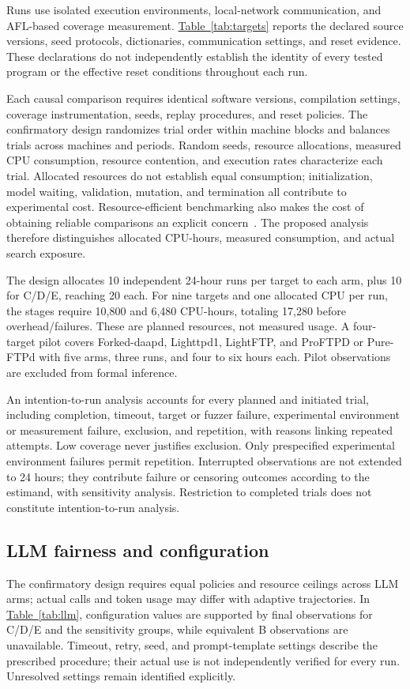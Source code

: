 \documentclass[final,5p,times,number]{elsarticle}
\newcommand{\namedref}[2]{\hyperref[#2]{#1~\ref*{#2}}}
\begin{document}
Runs use isolated execution environments, local-network communication, and AFL-based coverage measurement. \namedref{Table}{tab:targets} reports the declared source versions, seed protocols, dictionaries, communication settings, and reset evidence. These declarations do not independently establish the identity of every tested program or the effective reset conditions throughout each run.

Each causal comparison requires identical software versions, compilation settings, coverage instrumentation, seeds, replay procedures, and reset policies. The confirmatory design randomizes trial order within machine blocks and balances trials across machines and periods. Random seeds, resource allocations, measured CPU consumption, resource contention, and execution rates characterize each trial. Allocated resources do not establish equal consumption; initialization, model waiting, validation, mutation, and termination all contribute to experimental cost. Resource-efficient benchmarking also makes the cost of obtaining reliable comparisons an explicit concern~\cite{greenbenchmark2023}. The proposed analysis therefore distinguishes allocated CPU-hours, measured consumption, and actual search exposure.

The design allocates 10 independent 24-hour runs per target to each arm, plus 10 for C/D/E, reaching 20 each. For nine targets and one allocated CPU per run, the stages require 10,800 and 6,480 CPU-hours, totaling 17,280 before overhead/failures. These are planned resources, not measured usage. A four-target pilot covers Forked-daapd, Lighttpd1, LightFTP, and ProFTPD or Pure-FTPd with five arms, three runs, and four to six hours each. Pilot observations are excluded from formal inference.

An intention-to-run analysis accounts for every planned and initiated trial, including completion, timeout, target or fuzzer failure, experimental environment or measurement failure, exclusion, and repetition, with reasons linking repeated attempts. Low coverage never justifies exclusion. Only prespecified experimental environment failures permit repetition. Interrupted observations are not extended to 24 hours; they contribute failure or censoring outcomes according to the estimand, with sensitivity analysis. Restriction to completed trials does not constitute intention-to-run analysis.

\subsection{LLM fairness and configuration}
The confirmatory design requires equal policies and resource ceilings across LLM arms; actual calls and token usage may differ with adaptive trajectories. In \namedref{Table}{tab:llm}, configuration values are supported by final observations for C/D/E and the sensitivity groups, while equivalent B observations are unavailable. Timeout, retry, seed, and prompt-template settings describe the prescribed procedure; their actual use is not independently verified for every run. Unresolved settings remain identified explicitly.
\end{document}
